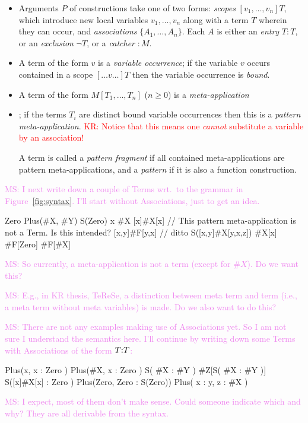 \documentclass[letterpaper,11pt]{article}
\newcommand{\KR}[1]{\textcolor{red}{KR: #1}}
\newcommand{\MS}[1]{\textcolor{violet}{MS: #1}}
\begin{document}
\begin{definition}
\begin{itemize}
  \item Arguments $P$ of constructions take one of two forms: \emph{scopes} $[v_1,…,v_n]T$, which
    introduce new local variables $v_1,…,v_n$ along with a term $T$ wherein they can occur, and
    \emph{associations} $\{A_1,…,A_n\}$. Each $A$ is either an \emph{entry} $T:T$, or an
    \emph{exclusion} $¬T$, or a \emph{catcher} ${:}M$.

  \item A term of the form $v$ is a \emph{variable occurrence}; if the variable $v$ occurs contained
    in a scope $[…v…]T$ then the variable occurrence is \emph{bound}.

  \item A term of the form $M[T_1,…,T_n]$ ($n≥0$) is a \emph{meta-application}

  \end{itemize}
  
  \begin{itemize}
  \item ; if the terms $T_i$ are distinct bound variable occurrences then this is a \emph{pattern
      meta-application}. \KR{Notice that this means one \emph{cannot} substitute a variable by an
      association!}  

    A term is called a \emph{pattern fragment} if all contained meta-applications are pattern
    meta-applications, and a \emph{pattern} if it is also a function construction.
  \end{itemize}

  \MS{I next write down a couple of Terms wrt.\ to the grammar in Figure~\ref{fig:syntax}.
      I'll start without Associations, just to get an idea.}
   \begin{hacs}[numbers=right,texcl]
     Zero                  
     Plus(#X, #Y) 
     S(Zero)         
     x                    
     #X                    
    [x]#X[x]               // This pattern meta-application is not a Term. Is this intended?
    [x,y]#F[y,x]           // ditto
    S([x,y]#X[y,x,z])
    #X[x]
    #F[Zero]           
    #F[#X]
   \end{hacs}
   \MS{So currently, a meta-application is not a term (except for $\#X$). Do we want this?}
   
   \MS{E.g., in KR thesis, TeReSe, a distinction between meta term and term (i.e., a meta term without
     meta variables) is made. Do we also want to do this?}
   
   \MS{There are not any examples making use of Associations yet. So I am not sure I understand the
     semantics here. I'll continue by writing down some Terms with Associations of the form $T \kw{:} T$:}
   \begin{hacs}[numbers=right,texcl]
     Plus(x, { x : Zero }) 
     Plus(#X, { x : Zero }) 
     S({ #X : #Y })                             
     #Z[S({ #X : #Y })]                    
     S({[x]#X[x] : Zero })  
     Plus(Zero, {Zero : S(Zero)})
     Plus( {x : y}, { z : #X })
   \end{hacs}
   \MS{I expect, most of them don't make sense. Could someone indicate which and why? They are all
     derivable from the syntax.}
   

\end{definition}
\end{document}
